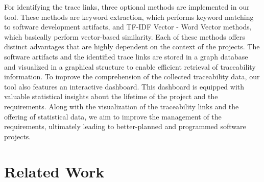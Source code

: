 \documentclass[conference]{IEEEtran}
\begin{document}
For identifying the trace links, three optional methods are implemented in our tool. These methods are keyword extraction, which performs keyword matching to software development artifacts, and TF-IDF Vector - Word Vector methods, which basically perform vector-based similarity. Each of these methods offers distinct advantages that are highly dependent on the context of the projects.
The software artifacts and the identified trace links are stored in a graph database and visualized in a graphical structure to enable efficient retrieval of traceability information. To improve the comprehension of the collected traceability data, our tool also features an interactive dashboard. This dashboard is equipped with valuable statistical insights about the lifetime of the project and the requirements. Along with the visualization of the traceability links and the offering of statistical data, we aim to improve the management of the requirements, ultimately leading to better-planned and programmed software projects.




\section{Related Work}
\label{section:related_work}
\end{document}
